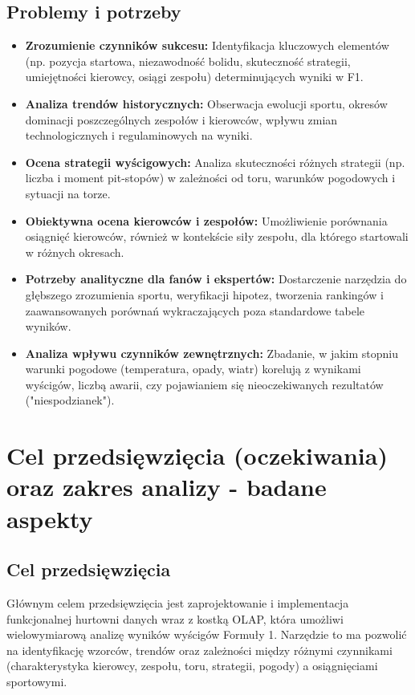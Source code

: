\documentclass[a4paper,12pt]{article}
\begin{document}
\subsection{Problemy i potrzeby}
\begin{itemize}[label=\textbullet, leftmargin=*]
  \item \textbf{Zrozumienie czynników sukcesu:} Identyfikacja kluczowych elementów (np. pozycja startowa, niezawodność bolidu, skuteczność strategii, umiejętności kierowcy, osiągi zespołu) determinujących wyniki w F1.
  \item \textbf{Analiza trendów historycznych:} Obserwacja ewolucji sportu, okresów dominacji poszczególnych zespołów i kierowców, wpływu zmian technologicznych i regulaminowych na wyniki.
  \item \textbf{Ocena strategii wyścigowych:} Analiza skuteczności różnych strategii (np. liczba i moment pit-stopów) w zależności od toru, warunków pogodowych i sytuacji na torze.
  \item \textbf{Obiektywna ocena kierowców i zespołów:} Umożliwienie porównania osiągnięć kierowców, również w kontekście siły zespołu, dla którego startowali w różnych okresach.
  \item \textbf{Potrzeby analityczne dla fanów i ekspertów:} Dostarczenie narzędzia do głębszego zrozumienia sportu, weryfikacji hipotez, tworzenia rankingów i zaawansowanych porównań wykraczających poza standardowe tabele wyników.
  \item \textbf{Analiza wpływu czynników zewnętrznych:} Zbadanie, w jakim stopniu warunki pogodowe (temperatura, opady, wiatr) korelują z wynikami wyścigów, liczbą awarii, czy pojawianiem się nieoczekiwanych rezultatów ("niespodzianek").
\end{itemize}

\section{Cel przedsięwzięcia (oczekiwania) oraz zakres analizy - badane aspekty}

\subsection{Cel przedsięwzięcia}
Głównym celem przedsięwzięcia jest zaprojektowanie i implementacja funkcjonalnej hurtowni danych wraz z kostką OLAP, która umożliwi wielowymiarową analizę wyników wyścigów Formuły 1. Narzędzie to ma pozwolić na identyfikację wzorców, trendów oraz zależności między różnymi czynnikami (charakterystyka kierowcy, zespołu, toru, strategii, pogody) a osiągnięciami sportowymi.
\end{document}

